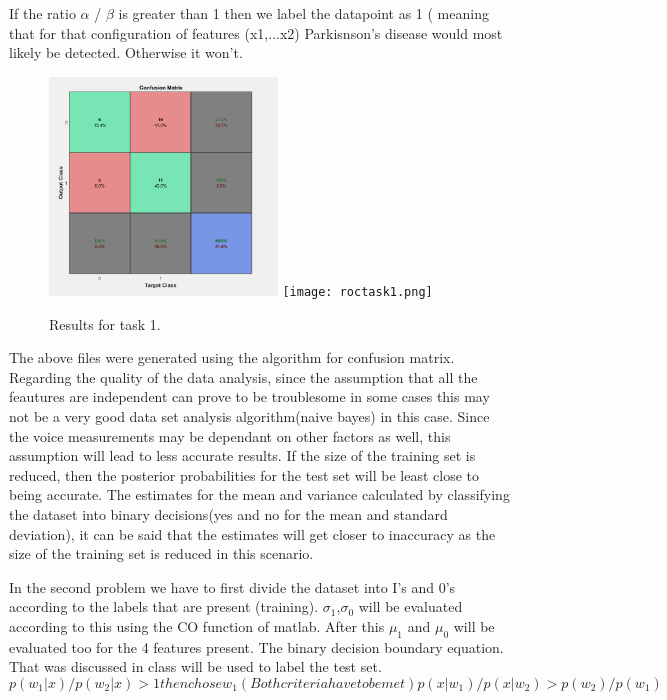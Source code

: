 \documentclass{article}
\begin{document}
If the ratio $\alpha$ / $\beta$ is greater than 1 then we label the datapoint as 1 ( meaning that for that configuration of features (x1,...x2) Parkisnson's disease would most likely be detected. Otherwise it won't.


\begin{figure}
\centering
\includegraphics[width=0.7\linewidth, height=5.8cm]{confusiontask1.png}
\texttt{[image: roctask1.png]}


\renewcommand{\figure}{Fig.}

\caption{Results for task 1. }

\label{fig:1}
\end{figure}

The above files were generated using the algorithm for confusion matrix. Regarding the quality of the data analysis, since the assumption that all the feautures are independent can prove to be troublesome in some cases this may not be a very good data set analysis algorithm(naive bayes) in this case. Since the voice measurements may be dependant on other factors as well, this assumption will lead to less accurate results.
If the size of the training set is reduced, then the posterior probabilities for the test set will be least close to being accurate. The estimates for the mean and variance calculated by classifying the dataset into binary decisions(yes and no for the mean and standard deviation), it can be said that the estimates will get closer to inaccuracy as the size of the training set is reduced in this scenario. 

In the second problem we have to first divide the dataset into I's and 0's according to the labels that are present (training). $\sigma_{1}$,$\sigma _{0}$ will be evaluated according to this using the CO function of matlab. After this $\mu _{1}$ and $\mu_{0}$ will be evaluated too for the 4 features present.
The binary decision boundary equation. That was discussed in class will be used to label the test set.
\begin{equation}
p(w_{1}|x)/p(w_{2}|x)> 1 
then chose w_{1} (Both criteria have to be met)
p(x|w_{1})/p(x|w_{2})>  p(w_{2})/p(w_{1})    
\end{equation}
\end{document}
